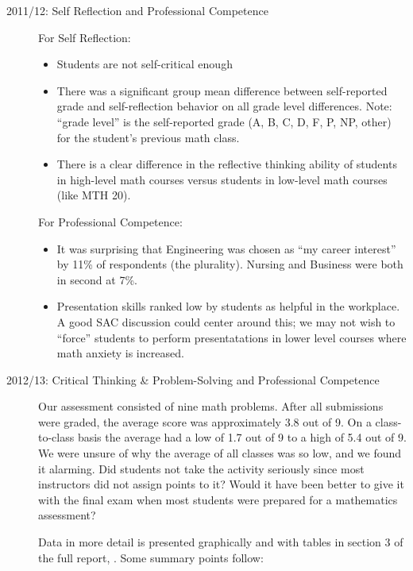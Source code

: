 \begin{description}

\item[2011/12: Self Reflection and Professional Competence]
For Self Reflection: 
\begin{itemize}
\item Students are not self-critical enough
\item There was a significant group mean difference between self-reported grade
  and self-reflection behavior on all grade level differences.  Note: ``grade
  level'' is the self-reported grade (A, B, C, D, F, P, NP, other) for the
  student's previous math class.
\item There is a clear difference in the reflective thinking ability of students
  in high-level math courses versus students in low-level math courses (like MTH
  20).
\end{itemize}
For Professional Competence:
\begin{itemize}
\item It was surprising that Engineering was chosen as ``my career interest'' by
  11\% of respondents (the plurality). Nursing and Business were both in second
  at 7\%.
\item Presentation skills ranked low by students as helpful in the workplace.
  A good SAC discussion could center around this; we may not
  wish to ``force'' students to perform presentatations in lower level courses where math
  anxiety is increased.
\end{itemize}

\item[2012/13:  Critical Thinking \& Problem-Solving and Professional Competence]

Our assessment consisted of nine math problems.  After all submissions were
graded, the average score was approximately 3.8 out of 9.  On a class-to-class
basis the average had a low of 1.7 out of 9 to a high of 5.4 out of 9.  We were
unsure of why the average of all classes was so low, and we found it alarming.
Did students not take the activity seriously since most instructors did not
assign points to it?  Would it have been better to give it with the final exam
when most students were prepared for a mathematics assessment? 

Data in more detail is presented graphically and with tables in section 3 of the
full report, \cite{annualLASreport2012}. Some summary points follow:


\end{description}
